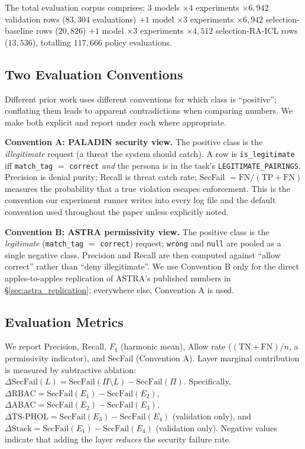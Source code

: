 \documentclass[10pt,a4paper,twocolumn]{article}
\begin{document}
The total evaluation corpus comprises: $3$ models $\times 4$ experiments $\times 6{,}942$ validation rows ($83{,}304$ evaluations) $+ 1$ model $\times 3$ experiments $\times 6{,}942$ selection-baseline rows ($20{,}826$) $+ 1$ model $\times 3$ experiments $\times 4{,}512$ selection-RA-ICL rows ($13{,}536$), totalling $117{,}666$ policy evaluations.

\subsection{Two Evaluation Conventions}
\label{sec:conventions}

Different prior work uses different conventions for which class is ``positive''; conflating them leads to apparent contradictions when comparing numbers. We make both explicit and report under each where appropriate.

\textbf{Convention A: PALADIN security view.} The positive class is the \emph{illegitimate} request (a threat the system should catch). A row is \texttt{is\_legitimate} iff \texttt{match\_tag} $=$ \texttt{correct} \emph{and} the persona is in the task's \texttt{LEGITIMATE\_PAIRINGS}. Precision is denial purity; Recall is threat catch rate; SecFail $= \mathrm{FN}/(\mathrm{TP}+\mathrm{FN})$ measures the probability that a true violation escapes enforcement. This is the convention our experiment runner writes into every log file and the default convention used throughout the paper unless explicitly noted.

\textbf{Convention B: ASTRA permissivity view.} The positive class is the \emph{legitimate} (\texttt{match\_tag} $=$ \texttt{correct}) request; \texttt{wrong} and \texttt{null} are pooled as a single negative class. Precision and Recall are then computed against ``allow correct'' rather than ``deny illegitimate''. We use Convention B only for the direct apples-to-apples replication of ASTRA's published numbers in \S\ref{sec:astra_replication}; everywhere else, Convention A is used.

\subsection{Evaluation Metrics}
\label{sec:eval_metrics}

We report Precision, Recall, $F_1$ (harmonic mean), Allow rate ($(\mathrm{TN}+\mathrm{FN})/n$, a permissivity indicator), and SecFail (Convention A). Layer marginal contribution is measured by subtractive ablation: $\Delta\mathrm{SecFail}(L) = \mathrm{SecFail}(\Pi \setminus L) - \mathrm{SecFail}(\Pi)$. Specifically, $\Delta\mathrm{RBAC} = \mathrm{SecFail}(E_1) - \mathrm{SecFail}(E_2)$, $\Delta\mathrm{ABAC} = \mathrm{SecFail}(E_2) - \mathrm{SecFail}(E_3)$, $\Delta\mathrm{TS\text{-}PHOL} = \mathrm{SecFail}(E_3) - \mathrm{SecFail}(E_4)$ (validation only), and $\Delta\mathrm{Stack} = \mathrm{SecFail}(E_1) - \mathrm{SecFail}(E_4)$ (validation only). Negative values indicate that adding the layer \emph{reduces} the security failure rate.
\end{document}
